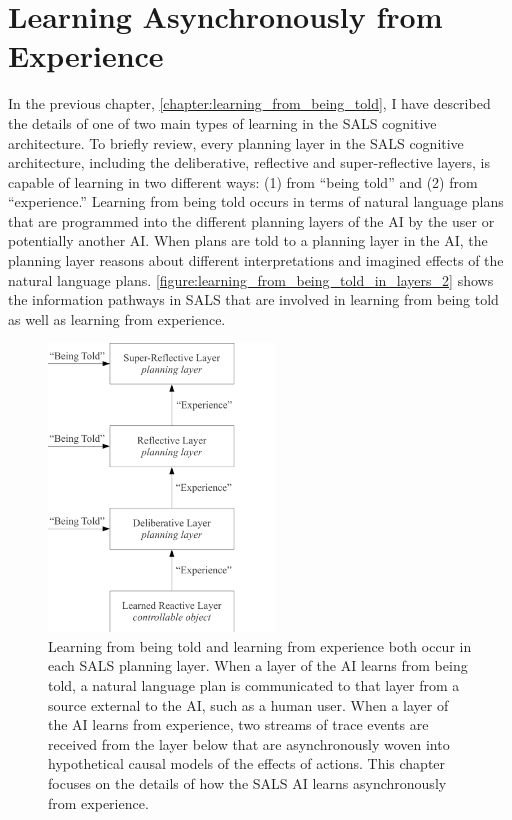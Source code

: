 \chapter{Learning Asynchronously from Experience}
\label{chapter:learning_asynchronously_from_experience}

In the previous chapter,
{\mbox{\autoref{chapter:learning_from_being_told}}},
I have described the details of one of two main types of learning in
the SALS cognitive architecture.  To briefly review, every planning
layer in the SALS cognitive architecture, including the deliberative,
reflective and super-reflective layers, is capable of learning in two
different ways: (1) from ``being told'' and (2) from ``experience.''
Learning from being told occurs in terms of natural language plans
that are programmed into the different planning layers of the AI by
the user or potentially another AI.  When plans are told to a planning
layer in the AI, the planning layer reasons about different
interpretations and imagined effects of the natural language plans.
{\mbox{\autoref{figure:learning_from_being_told_in_layers_2}}} shows
the information pathways in SALS that are involved in learning from
being told as well as learning from experience.
\begin{figure}
\centering
\includegraphics[width=6cm]{gfx/learning_from_being_told_in_layers}
\caption[Learning from being told and learning from experience both
  occur in each SALS planning layer.]{Learning from being told and
  learning from experience both occur in each SALS planning layer.
  When a layer of the AI learns from being told, a natural language
  plan is communicated to that layer from a source external to the AI,
  such as a human user.  When a layer of the AI learns from
  experience, two streams of trace events are received from the layer
  below that are asynchronously woven into hypothetical causal models
  of the effects of actions.  This chapter focuses on the details of
  how the SALS AI learns asynchronously from experience.}
\label{figure:learning_from_being_told_in_layers_2}
\end{figure}
